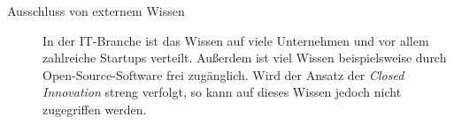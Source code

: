 \begin{description}
    \item[Ausschluss von externem Wissen]
        In der IT-Branche ist das Wissen auf viele Unternehmen und vor allem zahlreiche Startups verteilt.
        Außerdem ist viel Wissen beispielsweise durch Open-Source-Software frei zugänglich.
        Wird der Ansatz der \textit{Closed Innovation} streng verfolgt,
        so kann auf dieses Wissen jedoch nicht zugegriffen werden.
\end{description}